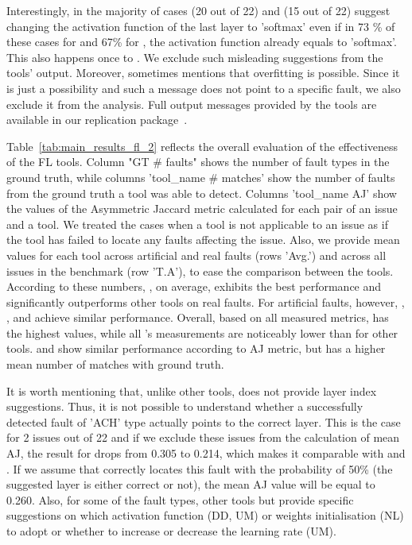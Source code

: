 Interestingly, in the majority of cases \UM (20 out of 22) and \DD (15 out of 22) suggest changing the activation function of the last layer to 'softmax' even if in 73 \% of these cases for \UM and 67\% for \DD, the activation function already equals to 'softmax'. This also happens once to \NL. We exclude such misleading suggestions from the tools' output. Moreover, sometimes \UM mentions that overfitting is possible. Since it is just a possibility and such a message does not point to a specific fault, we also exclude it from the analysis. Full output messages provided by the tools are available in our replication package~\cite{fl_comparison_replication}.

Table~\ref{tab:main_results_fl_2} reflects the overall evaluation of the effectiveness of the FL tools. Column "GT \# faults" shows the number of fault types in the ground truth, while columns 'tool\_name \# matches' show the number of faults from the ground truth a tool was able to detect. Columns 'tool\_name AJ' show the values of the Asymmetric Jaccard metric calculated for each pair of an issue and a tool. We treated the cases when a tool is not applicable to an issue as if the tool has failed to locate any faults affecting the issue. Also, we provide mean values for each tool across artificial and real faults (rows 'Avg.') and across all issues in the benchmark (row 'T.A'), to ease the comparison between the tools. According to these numbers, \dfd, on average, exhibits the best performance and significantly outperforms other tools on real faults. For artificial faults, however, \dfd, \NL, and \UM achieve similar performance. Overall, based on all measured metrics, \dfd has the highest values, while all \DD's measurements are noticeably lower than for other tools. \NL and \UM show similar performance according to AJ metric, but \NL has a higher mean number of matches with ground truth. 


It is worth mentioning that, unlike other tools, \dfd does not provide layer index suggestions. Thus, it is not possible to understand whether a successfully detected fault of 'ACH' type actually points to the correct layer. This is the case for 2 issues out of 22 and if we exclude these issues from the calculation of mean AJ, the result for \dfd drops from 0.305 to 0.214, which makes it comparable with \NL and \UM. If we assume that \dfd correctly locates this fault with the probability of 50\% (the suggested layer is either correct or not), the mean AJ value will be equal to 0.260. Also, for some of the fault types, other tools but \dfd provide specific suggestions on which activation function (DD, UM) or weights initialisation (NL) to adopt or whether to increase or decrease the learning rate (UM).


